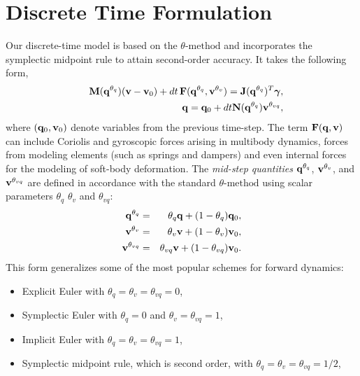 \section{Discrete Time Formulation}
Our discrete-time model is based on the $\theta\text{-method}$
 and incorporates the symplectic
midpoint rule to attain second-order accuracy. It takes the following form, 
\begin{eqnarray}
	&&\mf{M}(\mf{q}^{\theta_{q}})(\mf{v}-\mf{v}_0) +
	dt\,\mf{F}(\mf{q}^{\theta_{q}}, \mf{v}^{\theta_v}) =
	\mf{J}(\mf{q}^{\theta_{q}})^T\mf{\bgamma}, \label{eq:v_update}\\
	&&\mf{q} = \mf{q}_0 + dt\mf{N}(\mf{q}^{\theta_{q}})\mf{v}^{\theta_{vq}},
	\label{eq:q_update}
\end{eqnarray}
where $({\mathbf{q}}_0, {\mathbf{v}}_0)$ denote variables from the previous time-step. The
term ${\mathbf{F}}({\mathbf{q}}, {\mathbf{v}})$ can include Coriolis and gyroscopic forces arising
in multibody dynamics, forces from modeling elements (such as springs and
dampers) and even internal forces for the modeling of soft-body deformation. The
\emph{mid-step quantities} ${\mathbf{q}}^{\theta_{q}}$, ${\mathbf{v}}^{\theta_{v}}$, and
${\mathbf{v}}^{\theta_{vq}}$ are defined in accordance with the standard
$\theta\text{-method}$ using scalar parameters $\theta_q$ $\theta_v$ and
$\theta_{vq}$:
\begin{eqnarray*}
	{\mathbf{q}}^{\theta_q} &=& \theta_q{\mathbf{q}} + (1-\theta_{q}){\mathbf{q}}_0,\\
	{\mathbf{v}}^{\theta_v} &=& \theta_v{\mathbf{v}} + (1-\theta_v){\mathbf{v}}_0,\\
	{\mathbf{v}}^{\theta_{vq}} &=& \theta_{vq}{\mathbf{v}} + (1-\theta_{vq}){\mathbf{v}}_0.
\end{eqnarray*}
This form generalizes some of the most popular schemes for forward dynamics:
\begin{itemize}
	\item Explicit Euler with $\theta_q=\theta_{v}=\theta_{vq} = 0$,
	\item Symplectic Euler with $\theta_{q} = 0$ and $\theta_v = \theta_{vq}=1$,
	\item Implicit Euler with $\theta_{q} = \theta_v = \theta_{vq}= 1$,
	\item Symplectic midpoint rule, which is second order, with $\theta_{q} =
	\theta_v = \theta_{vq}= 1/2$,
\end{itemize}

